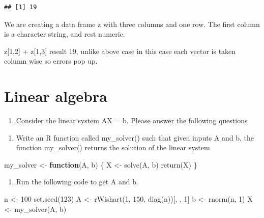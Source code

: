 \documentclass[
]{article}
\newenvironment{Shaded}{\begin{snugshade}}{\end{snugshade}}
\newcommand{\ControlFlowTok}[1]{\textcolor[rgb]{0.13,0.29,0.53}{\textbf{#1}}}
\newcommand{\DecValTok}[1]{\textcolor[rgb]{0.00,0.00,0.81}{#1}}
\newcommand{\FunctionTok}[1]{\textcolor[rgb]{0.00,0.00,0.00}{#1}}
\newcommand{\NormalTok}[1]{#1}
\newcommand{\OtherTok}[1]{\textcolor[rgb]{0.56,0.35,0.01}{#1}}
\providecommand{\tightlist}{%
  \setlength{\itemsep}{0pt}\setlength{\parskip}{0pt}}
\begin{document}
\begin{verbatim}
## [1] 19
\end{verbatim}

We are creating a data frame z with three columns and one row. The first
column is a character string, and rest numeric.

z{[}1,2{]} + z{[}1,3{]} result 19, unlike above case in this case each
vector is taken column wise so errors pop up.

\hypertarget{linear-algebra}{%
\section{Linear algebra}\label{linear-algebra}}

\begin{enumerate}
\def\labelenumi{\arabic{enumi}.}
\setcounter{enumi}{2}
\tightlist
\item
  Consider the linear system AX = b. Please answer the following
  questions
\end{enumerate}

\begin{enumerate}
\def\labelenumi{\alph{enumi}.}
\tightlist
\item
  Write an R function called my\_solver() such that given inputs A and
  b, the function my\_solver() returns the solution of the linear system
\end{enumerate}

\begin{Shaded}
\begin{Highlighting}[]
\NormalTok{my\_solver }\OtherTok{\textless{}{-}} \ControlFlowTok{function}\NormalTok{(A, b) \{}
\NormalTok{    X }\OtherTok{\textless{}{-}} \FunctionTok{solve}\NormalTok{(A, b)}
    \FunctionTok{return}\NormalTok{(X)}
\NormalTok{\}}
\end{Highlighting}
\end{Shaded}

\begin{enumerate}
\def\labelenumi{\alph{enumi}.}
\setcounter{enumi}{1}
\tightlist
\item
  Run the following code to get A and b.
\end{enumerate}

\begin{Shaded}
\begin{Highlighting}[]
\NormalTok{n }\OtherTok{\textless{}{-}} \DecValTok{100}
\FunctionTok{set.seed}\NormalTok{(}\DecValTok{123}\NormalTok{)}
\NormalTok{A }\OtherTok{\textless{}{-}} \FunctionTok{rWishart}\NormalTok{(}\DecValTok{1}\NormalTok{, }\DecValTok{150}\NormalTok{, }\FunctionTok{diag}\NormalTok{(n))[, , }\DecValTok{1}\NormalTok{]}
\NormalTok{b }\OtherTok{\textless{}{-}} \FunctionTok{rnorm}\NormalTok{(n, }\DecValTok{1}\NormalTok{)}
\NormalTok{X }\OtherTok{\textless{}{-}} \FunctionTok{my\_solver}\NormalTok{(A, b)}
\end{Highlighting}
\end{Shaded}
\end{document}
